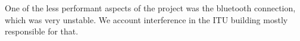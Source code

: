 
One of the less performant aspects of the project was the bluetooth connection, which was very unstable. 
We account interference in the ITU building mostly responsible for that. 